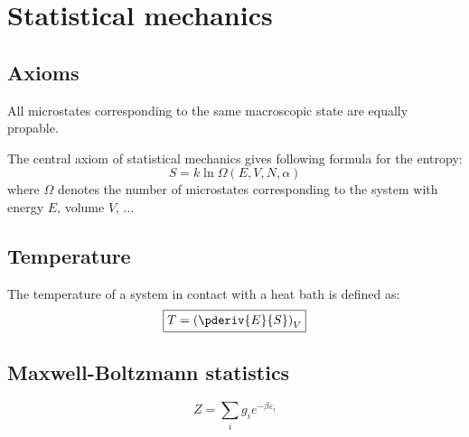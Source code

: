 \chapter{Statistical mechanics}

\section{Axioms}
    
	\begin{theorem}
    		All microstates corresponding to the same macroscopic state are equally propable.
	\end{theorem}
	
	\begin{theorem}
    		The central axiom of statistical mechanics gives following formula for the entropy:
		\begin{equation}
			\label{statmech:boltzmann_formula}
        		\boxed{S = k\ln\Omega(E, V, N, \alpha)}
		\end{equation}
	        where $\Omega$ denotes the number of microstates corresponding to the system with energy $E$, volume $V$, ...
	\end{theorem}
    
\section{Temperature}

    	\begin{formula}
		The temperature of a system in contact with a heat bath is defined as:
		\begin{equation}
		    	\label{statmech:temperature}
			\boxed{T = \left(\pderiv{E}{S}\right)_V}
		\end{equation}
	\end{formula}
    
\section{Maxwell-Boltzmann statistics}

	\begin{formula}\label{statmech:partition_function}
		\begin{equation}
			\boxed{Z = \sum_i{g_ie^{-\beta\varepsilon_i}}}
		\end{equation}
	\end{formula}
	
